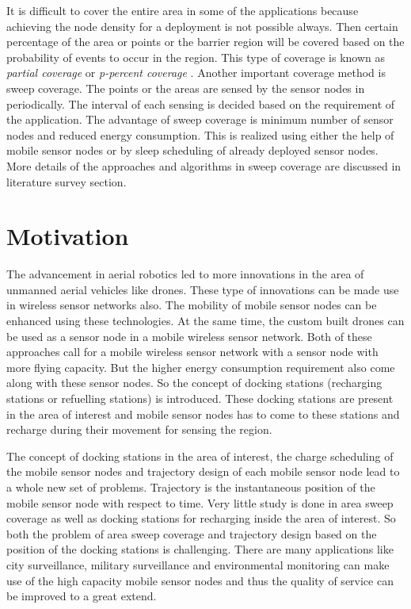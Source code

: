 It is difficult to cover the entire area in some of the applications because achieving the node density for a deployment is not possible always. Then certain percentage of the area or points or the barrier region will be covered based on the probability of events to occur in the region. This type of coverage is known as \textit{partial coverage} or \textit{p-percent coverage} \cite{mostafaei2015connected}. Another important coverage method is sweep coverage. The points or the areas are sensed by the sensor nodes in periodically. The interval of each sensing is decided based on the requirement of the application. The advantage of sweep coverage is minimum number of sensor nodes and reduced energy consumption. This is realized using either the help of mobile sensor nodes or by sleep scheduling of already deployed sensor nodes. More details of the approaches and algorithms in sweep coverage are discussed in literature survey section.

\section{Motivation}
The advancement in aerial robotics led to more innovations in the area of unmanned aerial vehicles like drones. These type of innovations can be made use in wireless sensor networks also. The mobility of mobile sensor nodes can be enhanced using these technologies. At the same time, the custom built drones can be used as a sensor node in a mobile wireless sensor network. Both of these approaches call for a mobile wireless sensor network with a sensor node with more flying capacity. But the higher energy consumption requirement also come along with these sensor nodes. So the concept of docking stations (recharging stations or refuelling stations) is introduced. These docking stations are present in the area of interest and mobile sensor nodes has to come to these stations and recharge during their movement for sensing the region.

The concept of docking stations in the area of interest, the charge scheduling of the mobile sensor nodes and trajectory design of each mobile sensor node lead to a whole new set of problems. Trajectory is the instantaneous position of the mobile sensor node with respect to time. Very little study is done in area sweep coverage as well as docking stations for recharging inside the area of interest. So both the problem of area sweep coverage and trajectory design based on the position of the docking stations is challenging. There are many applications like city surveillance, military surveillance and environmental monitoring can make use of the high capacity mobile sensor nodes and thus the quality of service can be improved to a great extend.
 
